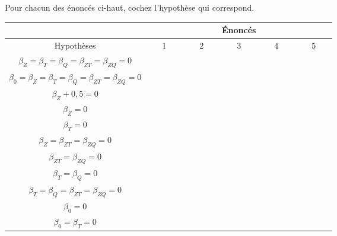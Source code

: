 \begin{questions}
\begin{parts}
 Pour chacun des énoncés ci-haut, cochez l'hypothèse qui correspond.
\begin{table}[h]
\begin{center}
\begin{tabular}{|c||ccccc|}
\hline
& \multicolumn{5}{c|}{Énoncés}\\ \hline
Hypothèses & \multicolumn{1}{l||}{~~~1~~~} & \multicolumn{1}{l||}{~~~2~~~} & \multicolumn{1}{l||}{~~~3~~~} & \multicolumn{1}{l||}{~~~4~~~} & \multicolumn{1}{l||}{~~~5~~~} \\ \hline
$ \beta_Z = \beta_T = \beta_Q = \beta_{ZT} = \beta_{ZQ} = 0  $ & \multicolumn{1}{l||}{}  & \multicolumn{1}{l||}{}  & \multicolumn{1}{l||}{}  & \multicolumn{1}{l||}{}  & \multicolumn{1}{l||}{}     \\ \hline
$ \beta_0 = \beta_Z = \beta_T = \beta_Q = \beta_{ZT} = \beta_{ZQ} = 0  $ & \multicolumn{1}{l||}{}  & \multicolumn{1}{l||}{}  & \multicolumn{1}{l||}{}  & \multicolumn{1}{l||}{}  & \multicolumn{1}{l||}{}     \\ \hline
$ \beta_Z + 0,5 = 0 $ & \multicolumn{1}{l||}{}  & \multicolumn{1}{l||}{}  & \multicolumn{1}{l||}{}  & \multicolumn{1}{l||}{}  & \multicolumn{1}{l||}{}     \\ \hline
$ \beta_Z = 0 $ & \multicolumn{1}{l||}{}  & \multicolumn{1}{l||}{}  & \multicolumn{1}{l||}{}  & \multicolumn{1}{l||}{}  & \multicolumn{1}{l||}{}     \\ \hline
$ \beta_T = 0 $ & \multicolumn{1}{l||}{}  & \multicolumn{1}{l||}{}  & \multicolumn{1}{l||}{}  & \multicolumn{1}{l||}{}  & \multicolumn{1}{l||}{}     \\ \hline
$ \beta_Z = \beta_{ZT} = \beta_{ZQ} = 0  $ & \multicolumn{1}{l||}{}  & \multicolumn{1}{l||}{}  & \multicolumn{1}{l||}{}  & \multicolumn{1}{l||}{}  & \multicolumn{1}{l||}{}     \\ \hline
$ \beta_{ZT} = \beta_{ZQ} = 0 $ & \multicolumn{1}{l||}{}  & \multicolumn{1}{l||}{}  & \multicolumn{1}{l||}{}  & \multicolumn{1}{l||}{}  & \multicolumn{1}{l||}{}     \\ \hline
$ \beta_T = \beta_Q = 0 $ & \multicolumn{1}{l||}{}  & \multicolumn{1}{l||}{}  & \multicolumn{1}{l||}{}  & \multicolumn{1}{l||}{}  & \multicolumn{1}{l||}{}     \\ \hline
$ \beta_T = \beta_Q = \beta_{ZT} = \beta_{ZQ} = 0 $ & \multicolumn{1}{l||}{}  & \multicolumn{1}{l||}{}  & \multicolumn{1}{l||}{}  & \multicolumn{1}{l||}{}  & \multicolumn{1}{l||}{}   \\ \hline
$ \beta_0 = 0 $ & \multicolumn{1}{l||}{}  & \multicolumn{1}{l||}{}  & \multicolumn{1}{l||}{}  & \multicolumn{1}{l||}{}  & \multicolumn{1}{l||}{}     \\ \hline
$ \beta_0 = \beta_T = 0 $ & \multicolumn{1}{l||}{}  & \multicolumn{1}{l||}{}  & \multicolumn{1}{l||}{}  & \multicolumn{1}{l||}{}  & \multicolumn{1}{l||}{}     \\ \hline
\end{tabular}
\end{center}
\end{table}


\end{parts}
\end{questions}
